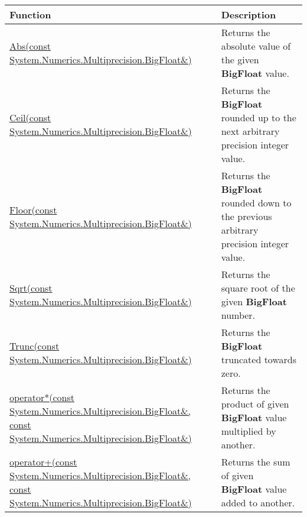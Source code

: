 \documentclass[a4paper,oneside,11.000000pt]{book}
\begin{document}
\begin{flushleft}
\begin{supertabular}[l]{!{\raggedright}p{7.575cm}!{\raggedright}p{7.575cm}}
\textbf{Function}
& \textbf{Description}
\\
\hline
\hyperlink{System.Numerics.Multiprecision.Abs.C.R.System.Numerics.Multiprecision.BigFloat}{Abs(const System.\-Numerics.\-Multiprecision.\-BigFloat\&\-)}
& Returns the absolute value of the given \textbf{BigFloat}
 value.

\\
\hyperlink{System.Numerics.Multiprecision.Ceil.C.R.System.Numerics.Multiprecision.BigFloat}{Ceil(const System.\-Numerics.\-Multiprecision.\-BigFloat\&\-)}
& Returns the \textbf{BigFloat}
 rounded up to the next arbitrary precision integer value.

\\
\hyperlink{System.Numerics.Multiprecision.Floor.C.R.System.Numerics.Multiprecision.BigFloat}{Floor(const System.\-Numerics.\-Multiprecision.\-BigFloat\&\-)}
& Returns the \textbf{BigFloat}
 rounded down to the previous arbitrary precision integer value.

\\
\hyperlink{System.Numerics.Multiprecision.Sqrt.C.R.System.Numerics.Multiprecision.BigFloat}{Sqrt(const System.\-Numerics.\-Multiprecision.\-BigFloat\&\-)}
& Returns the square root of the given \textbf{BigFloat}
 number.

\\
\hyperlink{System.Numerics.Multiprecision.Trunc.C.R.System.Numerics.Multiprecision.BigFloat}{Trunc(const System.\-Numerics.\-Multiprecision.\-BigFloat\&\-)}
& Returns the \textbf{BigFloat}
 truncated towards zero.

\\
\hyperlink{System.Numerics.Multiprecision.operator.times.C.R.System.Numerics.Multiprecision.BigFloat.C.R.System.Numerics.Multiprecision.BigFloat}{operator*(const System.\-Numerics.\-Multiprecision.\-BigFloat\&\-, const System.\-Numerics.\-Multiprecision.\-BigFloat\&\-)}
& Returns the product of given \textbf{BigFloat}
 value multiplied by another.

\\
\hyperlink{System.Numerics.Multiprecision.operator.plus.C.R.System.Numerics.Multiprecision.BigFloat.C.R.System.Numerics.Multiprecision.BigFloat}{operator+(const System.\-Numerics.\-Multiprecision.\-BigFloat\&\-, const System.\-Numerics.\-Multiprecision.\-BigFloat\&\-)}
& Returns the sum of given \textbf{BigFloat}
 value added to another.


\end{supertabular}
\end{flushleft}
\end{document}
